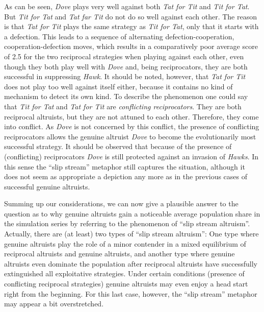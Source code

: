 As can be seen, {\em Dove} plays very well against both {\em Tat for Tit} and
{\em Tit for Tat}. But {\em Tit for Tat} and {\em Tat far Tit} do not do so
well against each other. The reason is that {\em Tat for Tit} plays the same
strategy as {\em Tit for Tat}, only that it starts with a defection. This
leads to a sequence of alternating defection-cooperation,
cooperation-defection moves, which results in a comparatively poor average 
score of 2.5 for the two reciprocal strategies when playing against each other,
even though they both play well 
with {\em Dove} and, being reciprocators, they are both successful in
suppressing {\em Hawk}. It should be noted, however, that {\em Tat for Tit} does not
play too well against itself either, because it contains no kind of mechanism
to detect its own kind. To describe the phenomenon one could say that {\em Tit
  for Tat} and {\em Tat for Tit} are {\em conflicting reciprocators}. They are
both reciprocal altruists, but they are not attuned to each other.  Therefore,
they come into conflict. As {\em Dove} is not concerned by this conflict, the
presence of conflicting reciprocators allows the genuine altruist {\em Dove}
to become the evolutionarily most successful strategy. It should be observed
that because of the presence of (conflicting) reciprocators {\em Dove} is
still protected against an invasion of {\em Hawks}. In this sense the ``slip
stream'' metaphor still captures the situation, although it does not seem as
appropriate a depiction any more as in the previous cases of successful
genuine altruists.

Summing up our considerations, we can now give a plausible answer to the
question as to why genuine altruists gain a noticeable average population
share in the simulation series by referring to the phenomenon of ``slip stream
altruism''.  Actually, there are (at least) two types of ``slip stream
altruism'': One type where genuine altruists play the role of a minor
contender in a mixed equilibrium of reciprocal altruists and genuine
altruists, and another type where genuine altruists even dominate the
population after reciprocal altruists have successfully extinguished all
exploitative strategies. Under certain conditions (presence of conflicting
reciprocal strategies) genuine altruists may even enjoy a head start right
from the beginning. For this last case, however, the ``slip stream'' metaphor
may appear a bit overstretched.


